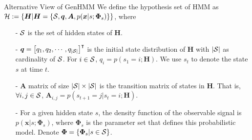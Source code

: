 \begin{frame}[label=current]{Alternative View of GenHMM}
  We define the hypothesis set of HMM as $\mathcal{H} := \{\bm{H} | \bm{H}=\{\mathcal{S}, \bm{q}, \bm{A}, p(\bm{x}|{s}; \bm{\Phi}_{s})\}\}$, where
  \begin{itemize}
  \item[-] $\mathcal{S}$ is the set of hidden states of $\bm{H}$.
  \item[-] $\bm{q} = \left[ q_1, q_2, \cdots, q_{|\mathcal{S}|}\right]^\intercal$ is the initial state distribution of $\bm{H}$ with $|\mathcal{S}|$ as cardinality of $\mathcal{S}$. For $i \in \mathcal{S}$, $q_i = p(s_{1}=i;\bm{H})$. We use $s_t$ to denote the state $s$ at time $t$.
  \item[-] $\bm{A}$ matrix of size $|\mathcal{S}| \times |\mathcal{S}|$ is the transition matrix of states in $\bm{H}$. That is, $\forall i, j \in \mathcal{S}$,  $\bm{A}_{i,j} = p(s_{t+1}=j|s_{t}=i; \bm{H})$.
  \item[-] For a given hidden state $s$, the density function of the observable signal is $p({\bm{x}}|{s};\bm{\Phi}_{s})$, where $\bm{\Phi}_{s}$ is the parameter set that defines this probabilistic model. Denote $\bm{\Phi} = \left\{ \bm{\Phi}_{s}| s \in \mathcal{S} \right\}$.
  \end{itemize}
\end{frame}



